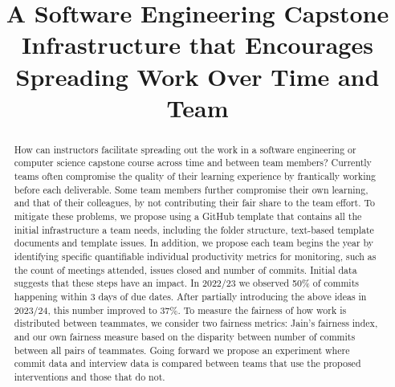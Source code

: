 \documentclass[10pt, conference]{IEEEtran}
\begin{document}
\title{A Software Engineering Capstone Infrastructure that Encourages Spreading
Work Over Time and Team}

\author{\IEEEauthorblockN{}
\IEEEauthorblockA{}


}

\maketitle
  
\begin{abstract}

How can instructors facilitate spreading out the work in a software engineering
or computer science capstone course across time and between team members?
Currently teams often compromise the quality of their learning experience by
frantically working before each deliverable.  Some team members further
compromise their own learning, and that of their colleagues, by not contributing
their fair share to the team effort. To mitigate these problems, we propose
using a GitHub template that contains all the initial infrastructure a team
needs, including the folder structure, text-based template documents and
template issues. In addition, we propose each team begins the year by
identifying specific quantifiable individual productivity metrics for
monitoring, such as the count of meetings attended, issues closed and number of
commits.  Initial data suggests that these steps have an impact.  In 2022/23 we
observed 50\% of commits happening within 3 days of due dates.  After partially
introducing the above ideas in 2023/24, this number improved to 37\%. To measure
the fairness of how work is distributed between teammates, we consider two
fairness metrics: Jain's fairness index, and our own fairness measure based on
the disparity between number of commits between all pairs of teammates.  Going
forward we propose an experiment where commit data and interview data is
compared between teams that use the proposed interventions and those that do
not.

\end{abstract}
\end{document}

